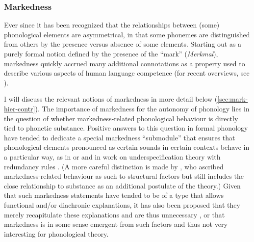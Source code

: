 \subsubsection{Markedness}
\label{sec:markedness}

Ever since \citet{Tru39} it has been recognized that the relationships between (some) phonological elements are asymmetrical, in that some phonemes are distinguished from others by the presence versus absence of some elements. Starting out as a purely formal notion defined by the presence of the \enquote{mark} (\textgerman{\emph{Merkmal}}), markedness quickly accrued many additional connotations as a property used to describe various aspects of human language competence (for recent overviews, see \citealp{haspelmath06:_again,rice07:_marked,hume11:_marked}).

I will discuss the relevant notions of markedness in more detail below (\cref{sec:mark-hier-contr}). The importance of markedness for the autonomy of phonology lies in the question of whether markedness\hyp related phonological behaviour is directly tied to phonetic substance. Positive answers to this question in formal phonology have tended to dedicate a special markedness \enquote{submodule} that ensures that phonological elements pronounced as certain sounds in certain contexts behave in a particular way, as in \citet[ch.~9]{spe} or \citet{calabrese-book} and in work on underspecification theory with redundancy rules \citep[\egm][]{archangeli-pulleyblank}. (A more careful distinction is made by \citealt{delacy2002,lacy04:_marked_optim_theor,delacy2006}, who ascribed markedness\hyp related behaviour as such to structural factors but still includes the close relationship to substance as an additional postulate of the theory.) Given that such markedness statements have tended to be of a type that allows functional and\fshyp or diachronic explanations, it has also been proposed that they merely recapitulate these explanations and are thus unnecessary \citep[\egm][]{ohala1981,hayes04:_phonet,blevins}, or that markedness is in some sense emergent from such factors and thus not very interesting for phonological theory.

